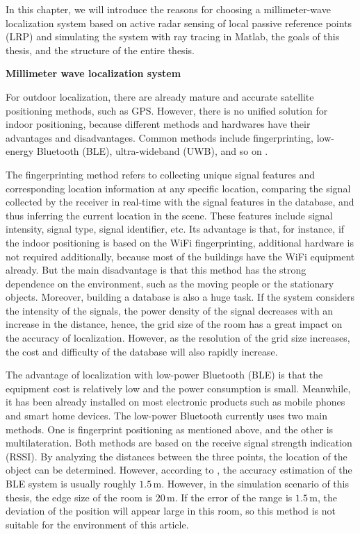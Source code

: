 \documentclass[12pt,DIV14,BCOR12mm,a4paper,footinclude=false,headinclude,parskip=half-,twoside,openright,cleardoublepage=empty,toc=index,bibliography=totoc,listof=totoc]{scrreprt}
\numberwithin{equation}{chapter}
\begin{document}
In this chapter, we will introduce the reasons for choosing a millimeter-wave localization system based on active radar sensing of local passive reference points (LRP) and simulating the system with ray tracing in Matlab, the goals of this thesis, and the structure of the entire thesis.

\begin{spacing}{1.5}
\textbf{\large{Millimeter wave localization system}}
\end{spacing}

For outdoor localization, there are already mature and accurate satellite positioning methods, such as GPS. However, there is no unified solution for indoor positioning, because different methods and hardwares have their advantages and disadvantages. Common methods include fingerprinting, low-energy Bluetooth (BLE), ultra-wideband (UWB), and so on \cite{methods_indoor_positioning}.

The fingerprinting method \cite{fingerprinting} refers to collecting unique signal features and corresponding location information at any specific location, comparing the signal collected by the receiver in real-time with the signal features in the database, and thus inferring the current location in the scene. These features include signal intensity, signal type, signal identifier, etc. Its advantage is that, for instance, if the indoor positioning is based on the WiFi fingerprinting, additional hardware is not required additionally, because most of the buildings have the WiFi equipment already. But the main disadvantage is that this method has the strong dependence on the environment, such as the moving people or the stationary objects. Moreover, building a database is also a huge task. If the system considers the intensity of the signals, the power density of the signal decreases with an increase in the distance, hence, the grid size of the room has a great impact on the accuracy of localization. However, as the resolution of the grid size increases, the cost and difficulty of the database will also rapidly increase.

The advantage of localization with low-power Bluetooth (BLE) \cite{cost_BLE} is that the equipment cost is relatively low and the power consumption is small. Meanwhile, it has been already installed on most electronic products such as mobile phones and smart home devices. The low-power Bluetooth currently uses two main methods. One is fingerprint positioning as mentioned above, and the other is multilateration. Both methods are based on the receive signal strength indication (RSSI). By analyzing the distances between the three points, the location of the object can be determined. However, according to \cite{BLE}, the accuracy estimation of the BLE system is usually roughly $1.5\,\mathrm{m}$. However, in the simulation scenario of this thesis, the edge size of the room is $20\,\mathrm{m}$. If the error of the range is $1.5\,\mathrm{m}$, the deviation of the position will appear large in this room, so this method is not suitable for the environment of this article.
\end{document}
